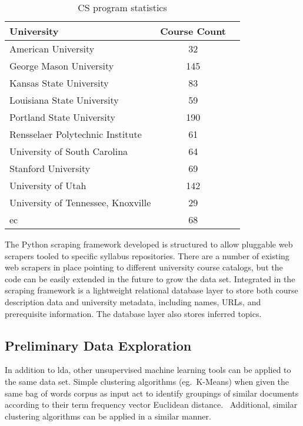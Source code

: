 
\begin{table}
  \centering
  \begin{tabular}{lcl}
    \toprule
    University & Course Count \\
    \midrule
    American University & 32 \\
    George Mason University & 145 \\
    Kansas State University & 83 \\
    Louisiana State University & 59 \\
    Portland State University & 190 \\
    Rensselaer Polytechnic Institute & 61 \\
    University of South Carolina & 64 \\
    Stanford University & 69 \\
    University of Utah & 142 \\
    University of Tennessee, Knoxville & 29 \\
    \midrule
    \ac{ec} & 68 \\
    \bottomrule
  \end{tabular}
  \caption{CS program statistics\label{tbl:dataset}}
\end{table}


The Python scraping framework developed is structured to allow pluggable web scrapers tooled to specific syllabus repositories.
There are a number of existing web scrapers in place pointing to different university course catalogs, but the code can be easily extended in the future to grow the data set.
Integrated in the scraping framework is a lightweight relational database layer to store both course description data and university metadata, including names, URLs, and prerequisite information.
The database layer also stores inferred topics.


\subsection{Preliminary Data Exploration}
\label{sec:data-exploration}


In addition to \ac{lda}, other unsupervised machine learning tools can be applied to the same data set.
Simple clustering algorithms (eg.\ K-Means) when given the same bag of words corpus as input act to identify groupings of similar documents according to their term frequency vector Euclidean distance.~\cite{lloyd1982}
Additional, similar clustering algorithms can be applied in a similar manner.

